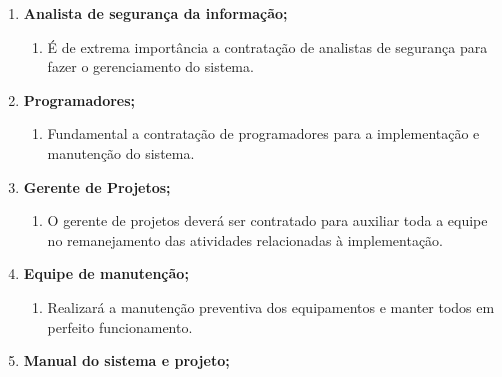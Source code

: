 \begin{enumerate}
\begin{enumerate}
            \end{enumerate}

      \item \textbf{Analista de segurança da informação;}
            \begin{enumerate}

                  \item	É de extrema importância a contratação de analistas de segurança para fazer o gerenciamento do sistema.



            \end{enumerate}

      \item \textbf{Programadores;}
            \begin{enumerate}

                  \item	 Fundamental a contratação de programadores para a implementação e manutenção do sistema.



            \end{enumerate}

      \item \textbf{Gerente de Projetos;}
            \begin{enumerate}

                  \item	O gerente de projetos deverá ser contratado para auxiliar toda a equipe no remanejamento das atividades relacionadas à implementação.



            \end{enumerate}

      \item \textbf{Equipe de manutenção;}
            \begin{enumerate}

                  \item	Realizará a manutenção preventiva dos equipamentos e manter todos em perfeito funcionamento.



            \end{enumerate}

      \item \textbf{Manual do sistema e projeto;}
            \begin{enumerate}


\end{enumerate}
\end{enumerate}
